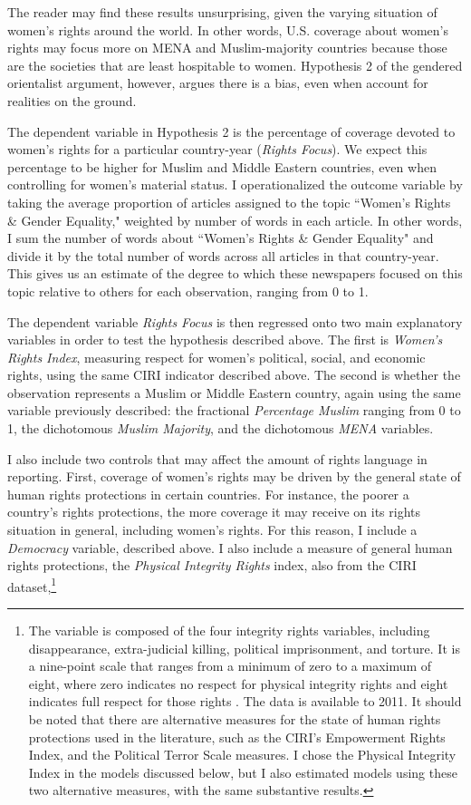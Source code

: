 \documentclass[11pt, oneside]{article}
\begin{document}
The reader may find these results unsurprising, given the varying situation of women's rights around the world. In other words, U.S. coverage about women's rights may focus more on MENA and Muslim-majority countries because those are the societies that are least hospitable to women. Hypothesis 2 of the gendered orientalist argument, however, argues there is a bias, even when account for realities on the ground.

The dependent variable in Hypothesis 2 is the percentage of coverage devoted to women's rights for a particular country-year (\emph{Rights Focus}).  We expect this percentage to be higher for Muslim and Middle Eastern countries, even when controlling for women's material status. I operationalized the outcome variable by taking the average proportion of articles assigned to the topic ``Women's Rights \& Gender Equality," weighted by number of words in each article. In other words, I sum the number of words about ``Women's Rights \& Gender Equality" and divide it by the total number of words across all articles in that country-year.  This gives us an estimate of the degree to which these newspapers focused on this topic relative to others for each observation, ranging from 0 to 1.

The dependent variable \emph{Rights Focus} is then regressed onto two main explanatory variables in order to test the hypothesis described above. The first is \emph{Women's Rights Index}, measuring respect for women's political, social, and economic rights, using the same CIRI indicator described above. The second is whether the observation represents a Muslim or Middle Eastern country, again using the same variable previously described: the fractional \emph{Percentage Muslim} ranging from 0 to 1, the dichotomous \emph{Muslim Majority}, and the dichotomous \emph{MENA} variables. 

I also include two controls that may affect the amount of rights language in reporting. First, coverage of women's rights may be driven by the general state of human rights protections in certain countries. For instance, the poorer a country's rights protections, the more coverage it may receive on its rights situation in general, including women's rights. For this reason, I include a \emph{Democracy} variable, described above. I also include a measure of general human rights protections, the \emph{Physical Integrity Rights} index, also from the CIRI dataset,\footnote{\hspace{5}The variable is composed of the four integrity rights variables, including disappearance, extra-judicial killing, political imprisonment, and torture. It is a nine-point scale that ranges from a minimum of zero to a maximum of eight, where zero indicates no respect for physical integrity rights and eight indicates full respect for those rights \cite{cingranelli2012}. The data is available to 2011. It should be noted that there are alternative measures for the state of human rights protections used in the literature, such as the CIRI's Empowerment Rights Index, and the Political Terror Scale measures. I chose the Physical Integrity Index in the models discussed below, but I also estimated models using these two alternative measures, with the same substantive results.}
\end{document}
